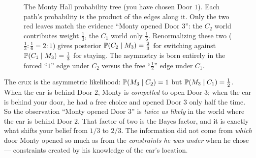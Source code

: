 \begin{figure}[H]
\centering
{}
\caption{The Monty Hall probability tree (you have chosen Door $1$). Each path's probability
is the product of the edges along it. Only the two red leaves match the evidence ``Monty
opened Door $3$'': the $C_2$ world contributes weight $\tfrac13$, the $C_1$ world only
$\tfrac16$. Renormalizing these two ($\tfrac13 : \tfrac16 = 2 : 1$) gives posterior
$\operatorname{\mathbb{P}}(C_2\mid M_3)=\tfrac23$ for switching against $\operatorname{\mathbb{P}}(C_1\mid M_3)=\tfrac13$ for staying.
The asymmetry is born entirely in the forced ``$1$'' edge under $C_2$ versus the free
``$\tfrac12$'' edge under $C_1$.}
\label{ch05:fig-monty}
\end{figure}

\begin{happeningbox}
The crux is the asymmetric likelihood: $\operatorname{\mathbb{P}}(M_3\mid C_2)=1$ but $\operatorname{\mathbb{P}}(M_3\mid C_1)=\tfrac12$.
When the car is behind Door $2$, Monty is \emph{compelled} to open Door $3$; when the car
is behind your door, he had a free choice and opened Door $3$ only half the time. So the
observation ``Monty opened Door $3$'' is \emph{twice as likely} in the world where the car
is behind Door $2$. That factor of two is the Bayes factor, and it is exactly what shifts
your belief from $1/3$ to $2/3$. The information did not come from \emph{which} door Monty
opened so much as from the \emph{constraints he was under} when he chose --- constraints
created by his knowledge of the car's location.
\end{happeningbox}

